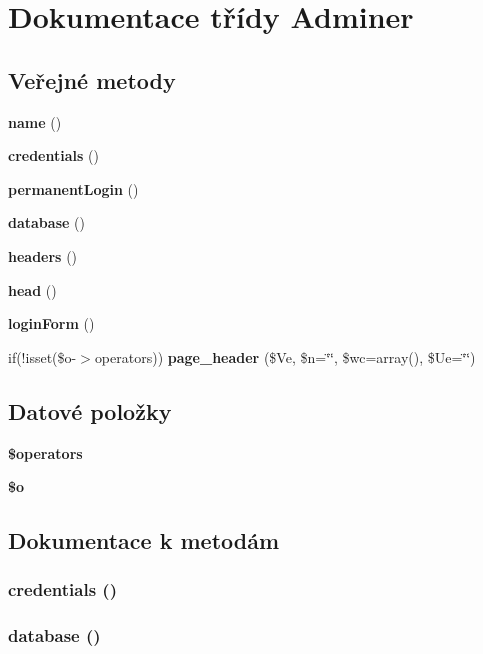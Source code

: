 \section{Dokumentace třídy Adminer}
\label{dc/d64/class_adminer}
\subsection*{Veřejné metody}
\begin{DoxyCompactItemize}
\item 
{\bf name} ()
\item 
{\bf credentials} ()
\item 
{\bf permanentLogin} ()
\item 
{\bf database} ()
\item 
{\bf headers} ()
\item 
{\bf head} ()
\item 
{\bf loginForm} ()
\item 
if(!isset(\$o-\/$>$operators)) {\bf page\_\-header} (\$Ve, \$n=\char`\"{}\char`\"{}, \$wc=array(), \$Ue=\char`\"{}\char`\"{})
\end{DoxyCompactItemize}
\subsection*{Datové položky}
\begin{DoxyCompactItemize}
\item 
{\bf \$operators}
\item 
{\bf \$o}
\end{DoxyCompactItemize}


\subsection{Dokumentace k metodám}
\subsubsection[{credentials}]{\setlength{\rightskip}{0pt plus 5cm}credentials ()}\label{dc/d64/class_adminer_ae4dbe803fc0e9c7316137599d79b00ab}
\subsubsection[{database}]{\setlength{\rightskip}{0pt plus 5cm}database ()}\label{dc/d64/class_adminer_a8f84d74d0c60c6a48d4be43c605fb2c9}
